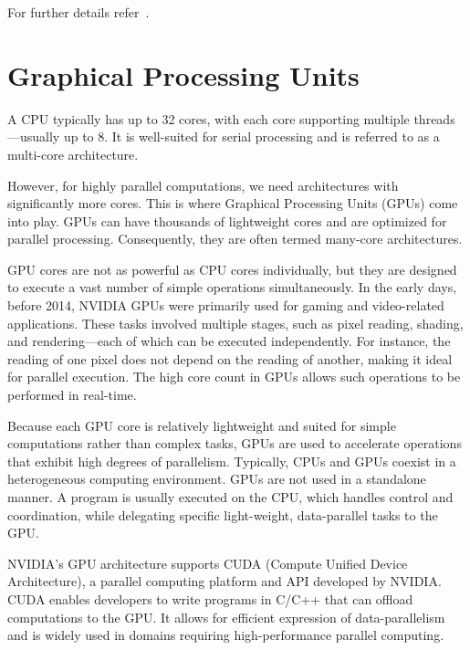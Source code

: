\documentclass[12pt]{book}
\begin{document}
For further details refer~\cite{MPI2Standard1997,snir1998mpi}.



















\chapter{Graphical Processing Units}

A CPU typically has up to 32 cores, with each core supporting multiple threads—usually up to 8. It is well-suited for serial processing and is referred to as a multi-core architecture.

However, for highly parallel computations, we need architectures with significantly more cores. This is where Graphical Processing Units (GPUs) come into play. GPUs can have thousands of lightweight cores and are optimized for parallel processing. Consequently, they are often termed many-core architectures.

GPU cores are not as powerful as CPU cores individually, but they are designed to execute a vast number of simple operations simultaneously. In the early days, before 2014, NVIDIA GPUs were primarily used for gaming and video-related applications. These tasks involved multiple stages, such as pixel reading, shading, and rendering—each of which can be executed independently. For instance, the reading of one pixel does not depend on the reading of another, making it ideal for parallel execution. The high core count in GPUs allows such operations to be performed in real-time.

Because each GPU core is relatively lightweight and suited for simple computations rather than complex tasks, GPUs are used to accelerate operations that exhibit high degrees of parallelism. Typically, CPUs and GPUs coexist in a heterogeneous computing environment. GPUs are not used in a standalone manner. A program is usually executed on the CPU, which handles control and coordination, while delegating specific light-weight, data-parallel tasks to the GPU.

NVIDIA's GPU architecture supports CUDA (Compute Unified Device Architecture), a parallel computing platform and API developed by NVIDIA. CUDA enables developers to write programs in C/C++ that can offload computations to the GPU. It allows for efficient expression of data-parallelism and is widely used in domains requiring high-performance parallel computing.
\end{document}
